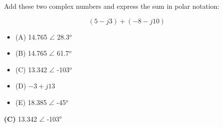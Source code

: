 

Add these two complex numbers and express the sum in polar notation:

$$(5 - j3) + (-8 - j10)$$

\begin{itemize}
\item{(A)} 14.765 $\angle$ 28.3$^{o}$
\vskip 5pt 
\item{(B)} 14.765 $\angle$ 61.7$^{o}$
\vskip 5pt 
\item{(C)} 13.342 $\angle$ -103$^{o}$
\vskip 5pt 
\item{(D)} $-3 + j13$
\vskip 5pt 
\item{(E)} 18.385 $\angle$ -45$^{o}$
\end{itemize}







{\bf (C)} 13.342 $\angle$ -103$^{o}$
 










